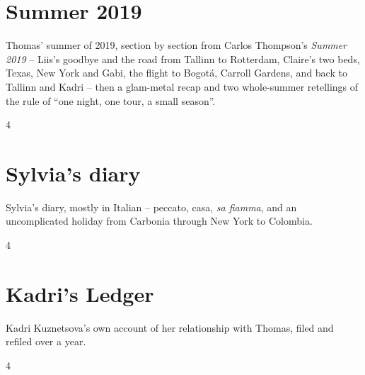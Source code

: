\documentclass[a4paper,landscape]{memoir}
\begin{document}
\chapter{Summer 2019}
Thomas' summer of 2019, section by section from Carlos Thompson's \emph{Summer 2019} -- Liis's goodbye and the road from Tallinn to Rotterdam, %
Claire's two beds, Texas, New York and Gabi, the flight to Bogot\'a, Carroll Gardens, and back to Tallinn and Kadri -- %
then a glam-metal recap and two whole-summer retellings of the rule of ``one night, one tour, a small season''.
\clearpage\begin{multicols*}{4}
\end{multicols*}

\chapter{Sylvia's diary}
Sylvia's diary, mostly in Italian -- peccato, casa, \emph{sa fiamma}, and an uncomplicated holiday from Carbonia through New York to Colombia.
\clearpage\begin{multicols*}{4}
\end{multicols*}

\chapter{Kadri's Ledger}
Kadri Kuznetsova's own account of her relationship with Thomas, filed and refiled over a year.
\clearpage\begin{multicols*}{4}






\end{multicols*}
\end{document}
